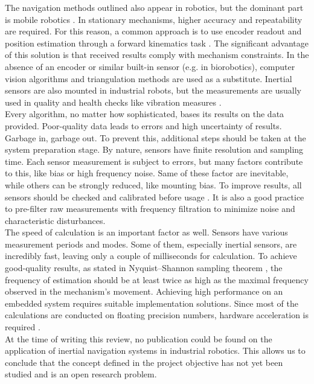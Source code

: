 The navigation methods outlined also appear in robotics, but the dominant part is mobile robotics \cite{accelerometer_mobile}. In stationary mechanisms, higher accuracy and repeatability are required. For this reason, a common approach is to use encoder readout and position estimation through a forward kinematics task \cite{forward_kinematics}. The significant advantage of this solution is that received results comply with mechanism constraints. In the absence of an encoder or similar built-in sensor (e.g. in biorobotics), computer vision algorithms \cite{cv_positioning} \cite{cv_positioning2} and triangulation methods \cite{igps} are used as a substitute. Inertial sensors are also mounted in industrial robots, but the measurements are usually used in quality and health checks like vibration measures \cite{Dogrusoz_2020}.\\

Every algorithm, no matter how sophisticated, bases its results on the data provided. Poor-quality data leads to errors and high uncertainty of results. Garbage in, garbage out. To prevent this, additional steps should be taken at the system preparation stage. By nature, sensors have finite resolution and sampling time. Each sensor measurement is subject to errors, but many factors contribute to this, like bias or high frequency noise. Same of these factor are inevitable, while others can be strongly reduced, like mounting bias. To improve results, all sensors should be checked and calibrated before usage \cite{mi13060879} \cite{Hol_2011} \cite{gyro_calib}. It is also a good practice to pre-filter raw measurements with frequency filtration \cite{BADRI20101425} to minimize noise and characteristic disturbances. \\

The speed of calculation is an important factor as well. Sensors have various measurement periods and modes. Some of them, especially inertial sensors, are incredibly fast, leaving only a couple of milliseconds for calculation. To achieve good-quality results, as stated in Nyquist–Shannon sampling theorem \cite{sample_theorem}, the frequency of estimation should be at least twice as high as the maximal frequency observed in the mechanism's movement. Achieving high performance on an embedded system requires suitable implementation solutions. Since most of the calculations are conducted on floating precision numbers, hardware acceleration is required  \cite{fpu2} \cite{fpu}.\\

At the time of writing this review, no publication could be found on the application of inertial navigation systems in industrial robotics. This allows us to conclude that the concept defined in the project objective has not yet been studied and is an open research problem.




